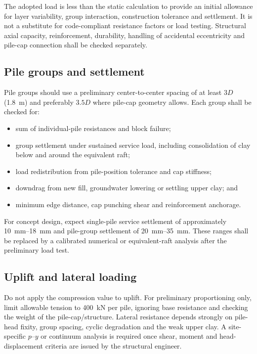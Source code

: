 The adopted load is less than the static calculation to provide an initial allowance for layer
variability, group interaction, construction tolerance and settlement. It is not a substitute for
code-compliant resistance factors or load testing. Structural axial capacity, reinforcement,
durability, handling of accidental eccentricity and pile-cap connection shall be checked
separately.

\subsection{Pile groups and settlement}
Pile groups should use a preliminary center-to-center spacing of at least $3D$ (\SI{1.8}{\metre})
and preferably $3.5D$ where pile-cap geometry allows. Each group shall be checked for:
\begin{itemize}
  \item sum of individual-pile resistances and block failure;
  \item group settlement under sustained service load, including consolidation of clay below
        and around the equivalent raft;
  \item load redistribution from pile-position tolerance and cap stiffness;
  \item downdrag from new fill, groundwater lowering or settling upper clay; and
  \item minimum edge distance, cap punching shear and reinforcement anchorage.
\end{itemize}

For concept design, expect single-pile service settlement of approximately
\SIrange{10}{18}{\milli\metre} and pile-group settlement of
\SIrange{20}{35}{\milli\metre}. These ranges shall be replaced by a calibrated numerical or
equivalent-raft analysis after the preliminary load test.

\subsection{Uplift and lateral loading}
Do not apply the compression value to uplift. For preliminary proportioning only, limit allowable
tension to \SI{400}{\kilo\newton} per pile, ignoring base resistance and checking the weight of
the pile-cap/structure. Lateral resistance depends strongly on pile-head fixity, group spacing,
cyclic degradation and the weak upper clay. A site-specific $p$--$y$ or continuum analysis is
required once shear, moment and head-displacement criteria are issued by the structural engineer.

